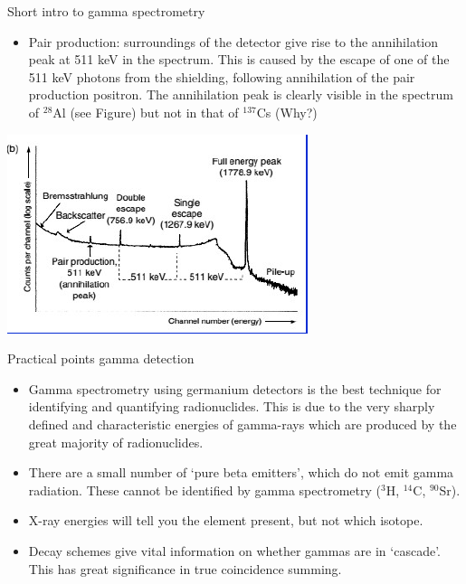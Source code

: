 \begin{frame}{Short intro to gamma spectrometry}

\begin{exampleblock}{}

{\small
\begin{itemize}
\item Pair production: surroundings of the detector give rise to the annihilation peak at 511 keV in the spectrum. This is caused by the escape of one of the 511 keV photons from the shielding, following annihilation of the pair production positron. The annihilation peak is clearly visible in the spectrum of $^{28}$Al (see Figure) but not in that of $^{137}$Cs \alert{(Why?})
\end{itemize}
}
\end{exampleblock}

\centering
\includegraphics[scale=0.6]{figures/specal28.png}

\end{frame}


\begin{frame}{Practical points gamma detection}

\begin{exampleblock}{}

{\small
\begin{itemize}
\item Gamma spectrometry using germanium detectors is the best technique for identifying and quantifying radionuclides. This is due to the very sharply defined and characteristic energies of gamma-rays which are produced by the great majority of radionuclides. 
\item There are a small number of ‘pure beta emitters’, which do not emit gamma radiation. These cannot be identified by gamma spectrometry ($^{3}$H, $^{14}$C, $^{90}$Sr). 
\item X-ray energies will tell you the element present, but not which isotope. 
\item Decay schemes give vital information on whether gammas are in ‘cascade’. This has great significance in true coincidence summing.
\end{itemize}
}
\end{exampleblock}

\end{frame}

